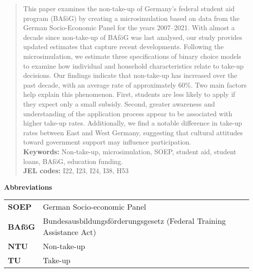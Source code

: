 \documentclass[12pt, a4paper]{article}
\date{Seminar date}
\begin{document}


\newpage
\begin{abstract}
\noindent This paper examines the non-take-up of Germany’s federal student aid program (BAföG) by creating a microsimulation based on data from the German Socio-Economic Panel for the years 2007--2021. 
With almost a decade since non-take-up of BAföG was last analysed, our study provides updated estimates that capture recent developments. 
Following the microsimulation, we estimate three specifications of binary choice models to examine how individual and household characteristics relate to take-up decisions. 
Our findings indicate that non-take-up has increased over the past decade, with an average rate of approximately 60\%. 
Two main factors help explain this phenomenon. 
First, students are less likely to apply if they expect only a small subsidy. 
Second, greater awareness and understanding of the application process appear to be associated with higher take-up rates. Additionally, we find a notable difference in take-up rates between East and West Germany, suggesting that cultural attitudes toward government support may influence participation.
\vspace{1cm} \\
    \noindent \textbf{Keywords:} Non-take-up, 
    microsimulation, 
    SOEP, 
    student aid, 
    student loans, 
    BAföG, 
    education funding. \\
    \noindent \textbf{JEL codes:} I22, I23, I24, I38, H53
\end{abstract}

\vspace{1cm}

\begin{center}
    \textbf{Abbreviations}
\end{center}
\begin{table}[H]
    \small
    \centering
    \begin{tabular}{ll}
        \textbf{SOEP}  & German Socio-economic Panel \\
        \textbf{BAföG}  & Bundesausbildungsförderungsgesetz (Federal Training Assistance Act) \\
        \textbf{NTU}  & Non-take-up \\
        \textbf{TU}  & Take-up \\
    \end{tabular}
\end{table}
\end{document}
